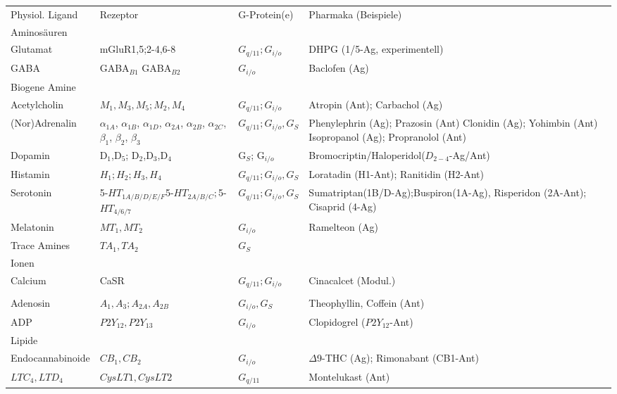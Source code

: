 \documentclass[10pt,a4paper]{report}
\begin{document}
\begin{table}
	\scriptsize
	\centering
	\begin{longtable}{p{3cm}p{3cm}lp{6cm}}
		\toprule
		Physiol. Ligand&Rezeptor&G-Protein(e)&Pharmaka (Beispiele)\\
		\addlinespace
		Aminosäuren&&&\\
		\midrule
		Glutamat&mGluR1,5;2-4,6-8&$G_{q/11}; G_{i/o}$&DHPG (1/5-Ag, experimentell)\\
		GABA&GABA$_{B1}$ GABA$_{B2}$&$G_{i/o}$&Baclofen (Ag)\\
		\addlinespace
		Biogene Amine&&&\\
		\midrule
		Acetylcholin&$M_1, M_3, M_5; M_2, M_4$&$G_{q/11}; G_{i/o}$&Atropin (Ant); Carbachol (Ag)\\
		(Nor)Adrenalin& $\alpha_{1A}$, $\alpha_{1B}$, $\alpha_{1D}$, $\alpha_{2A}$, $\alpha_{2B}$, $\alpha_{2C}$, $\beta_1$, $\beta_2$, $\beta_3$&$G_{q/11}; G_{i/o}, G_S$&Phenylephrin (Ag); Prazosin (Ant)  Clonidin (Ag); Yohimbin (Ant) Isopropanol (Ag); Propranolol (Ant)\\
		Dopamin&D$_1$,D$_5$; D$_2$,D$_3$,D$_4$& G$_{S}$; G$_{i/o}$&Bromocriptin/Haloperidol($D_{2-4}$-Ag/Ant)\\
		Histamin&$H_1; H_2; H_3,H_4$&$G_{q/11}; G_{i/o}, G_S$&Loratadin (H1-Ant); Ranitidin (H2-Ant)\\
		Serotonin&5-$HT_{1A/B/D/E/F}$5-$HT_{2A/B/C}; $5-$HT_{4/6/7}$&$G_{q/11}; G_{i/o}, G_S$& Sumatriptan(1B/D-Ag);Buspiron(1A-Ag), Risperidon (2A-Ant); Cisaprid (4-Ag)\\
		Melatonin&$MT_1,MT_2$&$G_{i/o}$&Ramelteon (Ag)\\
		Trace Amines&$TA_1, TA_2$&$G_S$&\\
		\addlinespace
		Ionen&&&\\
		\midrule
		Calcium&CaSR&$G_{q/11}; G_{i/o}$&Cinacalcet (Modul.)\\
		\addlinespace
		\multicolumn{4}{l}{Nukleotide / Nukleoside}\\
		\midrule
		Adenosin&$A_1,A_3; A_{2A}, A_{2B}$&$G_{i/o}, G_S$&Theophyllin, Coffein (Ant)\\
		ADP&$P2Y_{12}, P2Y_{13}$&$G_{i/o}$&Clopidogrel ($P2Y_{12}$-Ant)\\
		\addlinespace
		Lipide&&&\\
		\midrule
		Endocannabinoide&$CB_1, CB_2$&$G_{i/o}$&$\Delta$9-THC (Ag); Rimonabant (CB1-Ant)\\
		$LTC_4, LTD_4$&$CysLT1, CysLT2$&$G_{q/11}$&Montelukast (Ant)\\

\end{longtable}
\end{table}
\end{document}
